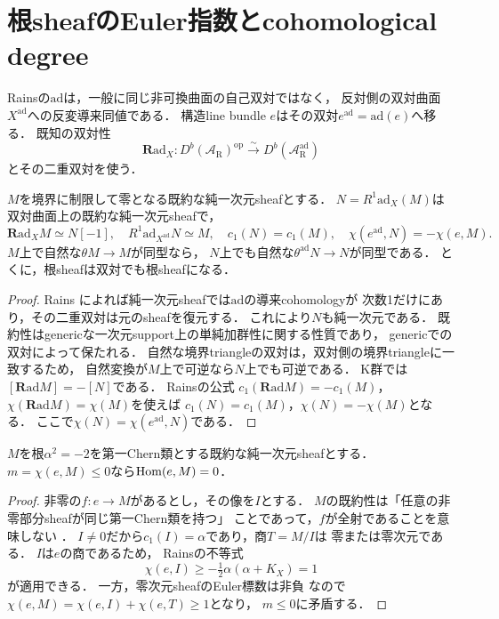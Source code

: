 \section{根sheafのEuler指数とcohomological degree}
\label{sec:sign-trichotomy}
Rainsの$\mathrm{ad}$は，一般に同じ非可換曲面の自己双対ではなく，
反対側の双対曲面$X^{\mathrm{ad}}$への反変導来同値である．
構造line bundle $e$はその双対$e^{\mathrm{ad}}=\mathrm{ad}(e)$へ移る．
既知の双対性
\[
 \mathbf R\mathrm{ad}_X:
 D^b(\mathcal A_{\mathrm R})^{\mathrm{op}}
 \xrightarrow{\sim}D^b(\mathcal A_{\mathrm R}^{\mathrm{ad}})
\]
とその二重双対を使う\cite[\S5, Corollary 5.9]{RainsBirational}．

\begin{lemma}[純一次元の双対と指数反転]
\label{lem:root-dual}
$M$を境界に制限して零となる既約な純一次元sheafとする．
$N=R^1\mathrm{ad}_X(M)$は双対曲面上の既約な純一次元sheafで，
\[
 \mathbf R\mathrm{ad}_X M\simeq N[-1],\quad
 R^1\mathrm{ad}_{X^{\mathrm{ad}}}N\simeq M,\quad
 c_1(N)=c_1(M),\quad \chi(e^{\mathrm{ad}},N)=-\chi(e,M).
\]
$M$上で自然な$\theta M\to M$が同型なら，
$N$上でも自然な$\theta^{\mathrm{ad}}N\to N$が同型である．
とくに，根sheafは双対でも根sheafになる．
\end{lemma}
\begin{proof}
Rains\cite[Corollaries 7.26, 7.30, 7.31]{RainsBirational}
によれば純一次元sheafでは$\mathrm{ad}$の導来cohomologyが
次数1だけにあり，その二重双対は元のsheafを復元する．
これにより$N$も純一次元である．
既約性はgenericな一次元support上の単純加群性に関する性質であり，
genericでの双対によって保たれる．
自然な境界triangleの双対は，双対側の境界triangleに一致するため，
自然変換が$M$上で可逆なら$N$上でも可逆である．
K群では$[\mathbf R\mathrm{ad}M]=-[N]$である．
Rains\cite[Proposition 7.16]{RainsBirational}の公式
$c_1(\mathbf R\mathrm{ad}M)=-c_1(M)$，
$\chi(\mathbf R\mathrm{ad}M)=\chi(M)$を使えば
$c_1(N)=c_1(M)$，$\chi(N)=-\chi(M)$となる．
ここで$\chi(N)=\chi(e^{\mathrm{ad}},N)$である．
\end{proof}

\begin{lemma}
\label{lem:no-section}
$M$を根$\alpha^2=-2$を第一Chern類とする既約な純一次元sheafとする．
$m=\chi(e,M)\le0$なら$\operatorname{Hom}(e,M)=0$．
\end{lemma}
\begin{proof}
非零の$f:e\to M$があるとし，その像を$I$とする．
$M$の既約性は「任意の非零部分sheafが同じ第一Chern類を持つ」
ことであって，$f$が全射であることを意味しない
\cite[\S11, pp.~138--140]{RainsBirational}．
$I\ne0$だから$c_1(I)=\alpha$であり，商$T=M/I$は
零または零次元である．
$I$は$e$の商であるため，
Rains\cite[Corollary 10.16]{RainsBirational}の不等式
\[
 \chi(e,I)\ge-\tfrac12\alpha(\alpha+K_X)=1
\]
が適用できる．
一方，零次元sheafのEuler標数は非負
\cite[Proposition 7.6]{RainsBirational}なので
$\chi(e,M)=\chi(e,I)+\chi(e,T)\ge1$となり，
$m\le0$に矛盾する．
\end{proof}

